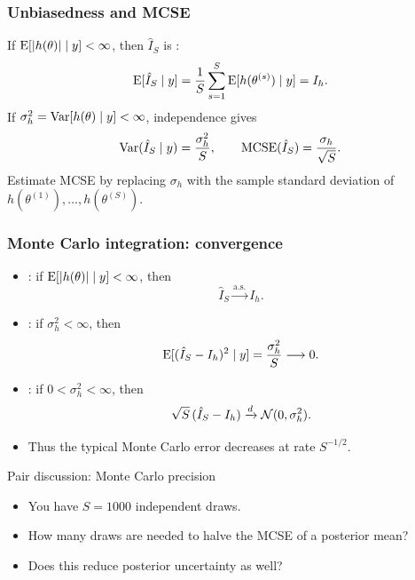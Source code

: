 \documentclass[10pt]{beamer}
\begin{document}
\begin{frame}
\frametitle{Unbiasedness and MCSE}

  If $\mathrm{E}[|h(\theta)|\mid y]<\infty$, then $\hat I_S$ is :
  \[
    \mathrm{E}[\hat I_S\mid y]
    =\frac{1}{S}\sum_{s=1}^S \mathrm{E}[h(\theta^{(s)})\mid y]
    =I_h.
  \]
  \pause
  If $\sigma_h^2=\mathrm{Var}[h(\theta)\mid y]<\infty$, independence gives
  \[
    \mathrm{Var}(\hat I_S\mid y)=\frac{\sigma_h^2}{S},
    \qquad
    \operatorname{MCSE}(\hat I_S)=\frac{\sigma_h}{\sqrt S}.
  \]
  \pause
  Estimate MCSE by replacing $\sigma_h$ with the sample standard deviation
  of $h(\theta^{(1)}),\ldots,h(\theta^{(S)})$.

\end{frame}

\begin{frame}
\frametitle{Monte Carlo integration: convergence}

\begin{itemize}
  \item {}: if
    $\mathrm{E}[|h(\theta)|\mid y]<\infty$, then
    \[
      \hat I_S \xrightarrow{\mathrm{a.s.}} I_h.
    \]
  \item<2-> : if $\sigma_h^2<\infty$, then
    \[
      \mathrm{E}[(\hat I_S-I_h)^2\mid y]=\frac{\sigma_h^2}{S}\longrightarrow 0.
    \]
  \item<3-> : if $0<\sigma_h^2<\infty$, then
    \[
      \sqrt S\,(\hat I_S-I_h)
      \xrightarrow{d}\mathcal{N}(0,\sigma_h^2).
    \]
  \item<4-> Thus the typical Monte Carlo error decreases at rate
    $S^{-1/2}$.
\end{itemize}

\end{frame}

\begin{frame}{Pair discussion: Monte Carlo precision}

  \begin{itemize}
  \item You have $S=1000$ independent draws.
  \item How many draws are needed to halve the MCSE of a posterior mean?
  \item Does this reduce posterior uncertainty as well?
  \end{itemize}


\end{frame}
\end{document}
